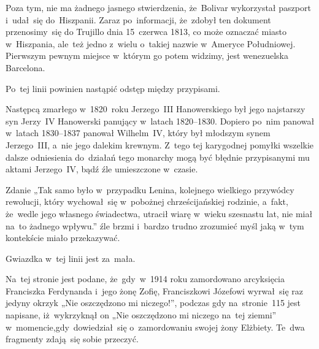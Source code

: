\documentclass[a4paper,11pt]{article}
\begin{document}
Poza tym, nie ma żadnego jasnego stwierdzenia, że~Bolivar wykorzystał
paszport i~udał~się do~Hiszpanii. Zaraz po~informacji, że~zdobył ten
dokument przenosimy~się do Trujillo dnia 15~czerwca 1813, co może
oznaczać miasto w~Hiszpania, ale~też jedno z~wielu o~takiej nazwie
w~Ameryce Południowej. Pierwszym pewnym miejsce w~którym go potem
widzimy, jest wenezuelska Barcelona.

\VerSpaceFour





\noindent
{} Po~tej linii powinien nastąpić odstęp między przypisami.

\VerSpaceFour





\noindent
{} Następcą zmarłego w~1820~roku Jerzego~III Hanowerskiego był jego
najstarszy syn Jerzy~IV Hanowerski panujący w~latach 1820--1830. Dopiero
po~nim panował w~latach 1830--1837 panował Wilhelm~IV, który był młodszym
synem Jerzego~III, a~nie jego dalekim krewnym. Z~tego tej karygodnej
pomyłki wszelkie dalsze odniesienia do~działań tego monarchy mogą być
błędnie przypisanymi mu aktami Jerzego~IV, bądź źle umieszczone w~czasie.

\VerSpaceFour





\noindent
{} Zdanie „Tak samo było w~przypadku Lenina, kolejnego
wielkiego przywódcy rewolucji, który wychował~się w~pobożnej
chrześcijańskiej rodzinie, a~fakt, że~wedle jego własnego świadectwa,
utracił wiarę w~wieku szesnastu lat, nie miał na~to żadnego wpływu.”
źle brzmi i~bardzo trudno zrozumieć myśl jaką w~tym kontekście miało
przekazywać.

\VerSpaceFour





\noindent
{} Gwiazdka w~tej linii jest za~mała.

\VerSpaceFour





\noindent
{} Na~tej stronie jest podane, że~gdy~w~1914 roku zamordowano
arcyksięcia Franciszka Ferdynanda i~jego żonę Zofię, Franciszkowi Józefowi
wyrwał~się raz jedyny okrzyk „Nie oszczędzono mi niczego!”, podczas gdy
na~stronie~115 jest napisane, iż~wykrzyknął on „Nie oszczędzono mi niczego
na~tej ziemni” w~momencie,gdy~dowiedział~się o~zamordowaniu swojej żony
Elżbiety. Te~dwa fragmenty zdają~się sobie przeczyć.
\end{document}
